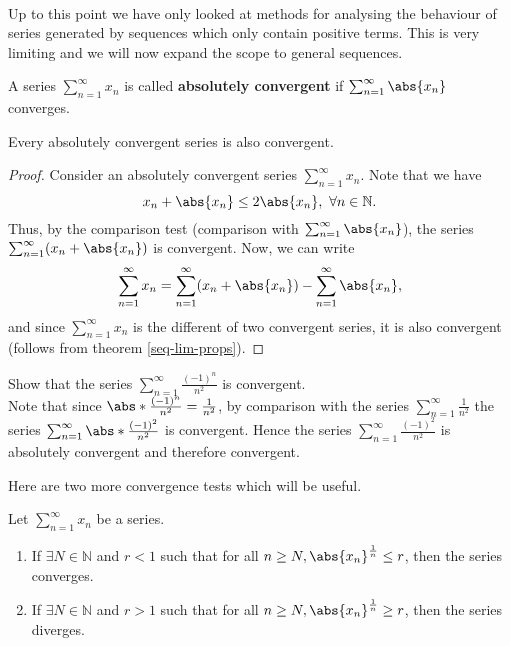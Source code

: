 \documentclass[../real_analysis.tex]{subfiles}
\begin{document}
        \paragraph{}
        Up to this point we have only looked at methods for analysing the behaviour of series generated by sequences which only contain positive terms. This is very limiting and we will now expand the scope to general sequences.
        \begin{definition}
            A series $\sum_{n=1}^\infty x_n$ is called \textbf{absolutely convergent} if $\sum_{n=1}^\infty\abs{x_n}$ converges.
        \end{definition}
        \begin{theorem}
            Every absolutely convergent series is also convergent.
        \end{theorem}
        \begin{proof}
            Consider an absolutely convergent series $\sum_{n=1}^\infty x_n$. Note that we have
            \begin{equation*}
                x_n+\abs{x_n}\leq2\abs{x_n},\ \forall n\in\mathbb{N}.
            \end{equation*}
            Thus, by the comparison test (comparison with $\sum_{n=1}^\infty\abs{x_n}$), the series $\sum_{n=1}^\infty(x_n+\abs{x_n})$ is convergent. Now, we can write
            \begin{equation*}
                \sum_{n=1}^\infty x_n=\sum_{n=1}^\infty(x_n+\abs{x_n})-\sum_{n=1}^\infty\abs{x_n},
            \end{equation*}
            and since $\sum_{n=1}^\infty x_n$ is the different of two convergent series, it is also convergent (follows from theorem \ref{seq-lim-props}).
        \end{proof}
        \begin{example}
            Show that the series $\sum_{n=1}^\infty\frac{(-1)^n}{n^2}$ is convergent.\\
            Note that since $\abs*{\frac{(-1)^n}{n^2}}=\frac{1}{n^2}$, by comparison with the series $\sum_{n=1}^\infty\frac{1}{n^2}$ the series $\sum_{n=1}^\infty\abs*{\frac{(-1)^2}{n^2}}$ is convergent. Hence the series $\sum_{n=1}^\infty\frac{(-1)^2}{n^2}$ is absolutely convergent and therefore convergent.
        \end{example}
        Here are two more convergence tests which will be useful.
        \begin{theorem}\label{root-test}
            Let $\sum_{n=1}^\infty x_n$ be a series.
            \begin{enumerate}[label={\upshape(\roman*)}]
                \item If $\exists N\in\mathbb{N}$ and $r<1$ such that for all $n\geq N, \abs{x_n}^\frac{1}{n}\leq r$, then the series converges.
                \item If $\exists N\in\mathbb{N}$ and $r>1$ such that for all $n\geq N, \abs{x_n}^\frac{1}{n}\geq r$, then the series diverges.
            \end{enumerate}
        \end{theorem}
\end{document}
